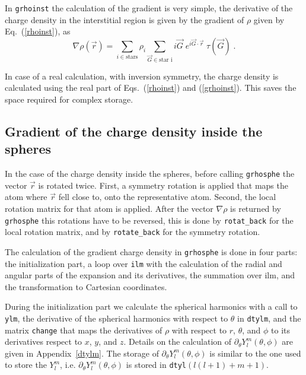 \documentclass{article}
\begin{document}
In \texttt{grhoinst} the calculation of the gradient is very simple,
the derivative of the charge density in the interstitial region is
given by the gradient of $\rho$ given by Eq.~(\ref{rhoinst}), as
\begin{equation}
\nabla\rho(\vec{r})=\sum_{i\in\mbox{stars}}\rho_i\sum_{\vec{G}\in\mbox{star
i}}i\vec{G}\;e^{i\vec{G}\cdot\vec{r}}\;\tau(\vec{G})\;.
\label{grhoinst}
\end{equation}

In case of a real calculation, with inversion symmetry, the charge
density is calculated using the real part of Eqs.~(\ref{rhoinst}) and
(\ref{grhoinst}). This saves the space required for complex storage.

\subsection{Gradient of the charge density inside the spheres}

In the case of the charge density inside the spheres, before calling
\texttt{grhosphe} the vector $\vec{r}$ is rotated twice. First, a
symmetry rotation is applied that maps the atom where $\vec{r}$ fell
close to, onto the representative atom. Second, the local rotation
matrix for that atom is applied. After the vector $\nabla\rho$ is
returned by \texttt{grhosphe} this rotations have to be reversed, this
is done by \texttt{rotat\_back} for the local rotation matrix, and by
\texttt{rotate\_back} for the symmetry rotation.

The calculation of the gradient charge density in \texttt{grhosphe} is
done in four parts: the initialization part, a loop over \texttt{ilm}
with the calculation of the radial and angular parts of the expansion
and its derivatives, the summation over ilm, and the transformation to
Cartesian coordinates.

During the initialization part we calculate the spherical harmonics
with a call to \texttt{ylm}, the derivative of the spherical harmonics
with respect to $\theta$ in \texttt{dtylm}, and the matrix
\texttt{change} that maps the derivatives of $\rho$ with respect to
$r$, $\theta$, and $\phi$ to its derivatives respect to $x$, $y$, and
$z$. Details on the calculation of $\partial_{\theta}
Y_l^m(\theta,\phi)$ are given in Appendix~\ref{dtylm}. The storage of
$\partial_{\theta} Y_l^m(\theta,\phi)$ is similar to the one used to
store the $Y_l^m$, i.e.  $\partial_{\theta} Y_l^m(\theta,\phi)$ is
stored in \texttt{dtyl}$\left(l(l+1)+m+1\right)$.
\end{document}
